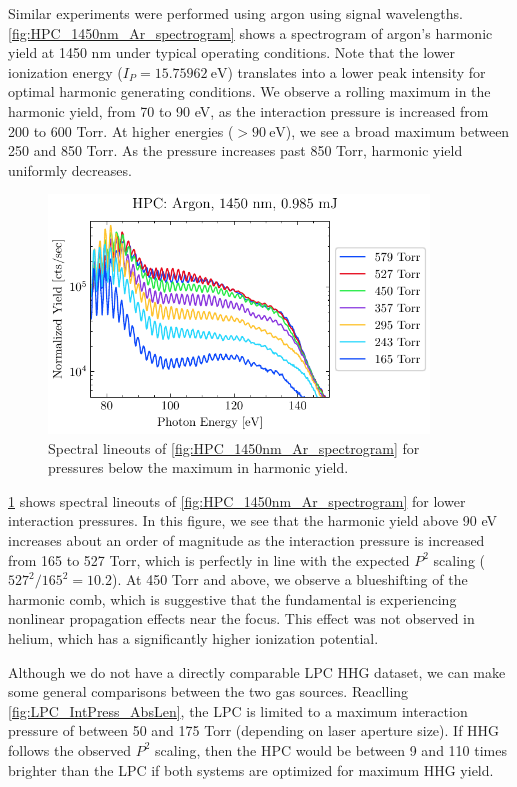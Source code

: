 Similar experiments were performed using argon using signal wavelengths. \cref{fig:HPC_1450nm_Ar_spectrogram} shows a spectrogram of argon's harmonic yield at 1450 nm under typical operating conditions. Note that the lower ionization energy ($I_P = 15.75962 \ \textrm{eV}$) translates into a lower peak intensity for optimal harmonic generating conditions. We observe a rolling maximum in the harmonic yield, from 70 to 90 eV, as the interaction pressure is increased from 200 to 600 Torr. At higher energies ($> 90 \ \textrm{eV}$), we see a broad maximum between 250 and 850 Torr. As the pressure increases past 850 Torr, harmonic yield uniformly decreases.

\begin{figure}
	\centering
	\includegraphics[width=0.9\textwidth]{figures/chap3/HPC_1450nm_Ar_lineouts.pdf}
	\caption{Spectral lineouts of \cref{fig:HPC_1450nm_Ar_spectrogram} for pressures below the maximum in harmonic yield.}
	\label{fig:HPC_1450nm_Ar_lineouts}
\end{figure}

\cref{fig:HPC_1450nm_Ar_lineouts} shows spectral lineouts of \cref{fig:HPC_1450nm_Ar_spectrogram} for lower interaction pressures. In this figure, we see that the harmonic yield above 90 eV increases about an order of magnitude as the interaction pressure is increased from 165 to 527 Torr, which is perfectly in line with the expected $P^2$ scaling ($527^2/165^2 = 10.2$). At 450 Torr and above, we observe a blueshifting of the harmonic comb, which is suggestive that the fundamental is experiencing nonlinear propagation effects near the focus. This effect was not observed in helium, which has a significantly higher ionization potential.

Although we do not have a directly comparable LPC HHG dataset, we can make some general comparisons between the two gas sources. Reaclling \cref{fig:LPC_IntPress_AbsLen}, the LPC is limited to a maximum interaction pressure of between 50 and 175 Torr (depending on laser aperture size). If HHG follows the observed $P^2$ scaling, then the HPC would be between 9 and 110 times brighter than the LPC if both systems are optimized for maximum HHG yield.

